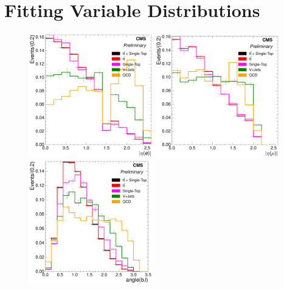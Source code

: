 \section{Fitting Variable Distributions}
\label{as:fitting_variables_distributions}
\begin{figure}[hbtp]
    \centering
     \includegraphics[width=0.48\textwidth]{Chapters/04_Analysis/04b_XSections/images/8TeV/fit_variables/electron/MET/electron_absolute_eta/MET_inclusive_electron_absolute_eta_2orMoreBtags_templates.pdf}\hfill
     \includegraphics[width=0.48\textwidth]{Chapters/04_Analysis/04b_XSections/images/8TeV/fit_variables/muon/MET/muon_absolute_eta/MET_inclusive_muon_absolute_eta_2orMoreBtags_templates.pdf}\\
     \includegraphics[width=0.48\textwidth]{Chapters/04_Analysis/04b_XSections/images/8TeV/fit_variables/electron/MET/angle_bl/MET_inclusive_angle_bl_2orMoreBtags_templates.pdf}\hfill

\end{figure}

